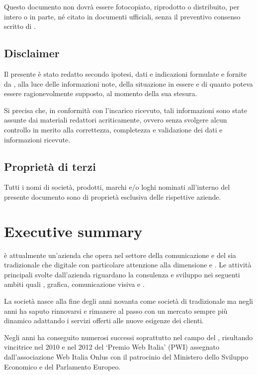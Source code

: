 Questo documento non dovrà essere fotocopiato, riprodotto o distribuito, per intero o in parte, né citato in documenti ufficiali, senza il preventivo consenso scritto di \customer.

\section{Disclaimer}
Il presente  è stato redatto secondo ipotesi, dati e indicazioni formulate e fornite da \customer, alla luce delle informazioni note, della situazione in essere e di quanto poteva essere ragionevolmente supposto, al momento della sua stesura.

Si precisa che, in conformità con l'incarico ricevuto, tali informazioni sono state assunte dai materiali redattori acriticamente, ovvero senza svolgere alcun controllo in merito alla correttezza, completezza e validazione dei dati e informazioni ricevute.

\section{Proprietà di terzi}
Tutti i nomi di società, prodotti, marchi e/o loghi nominati all'interno del presente documento sono di proprietà esclusiva delle rispettive aziende.

\chapter{Executive summary}\label{sec:summary}

\customer è attualmente un'azienda che opera nel settore della comunicazione e del \mktg sia tradizionale che digitale con particolare attenzione alla dimensione  e . Le attività principali svolte dall'azienda riguardano la consulenza e sviluppo nei seguenti ambiti quali , grafica, comunicazione visiva e \mktg {}.

La società nasce alla fine degli anni novanta come società di  tradizionale ma negli anni ha saputo rinnovarsi e rimanere al passo con un mercato sempre più dinamico adattando i servizi offerti alle nuove esigenze dei clienti.

Negli anni \customer ha conseguito numerosi successi soprattutto nel campo del , risultando vincitrice nel 2010 e nel 2012 del `Premio Web Italia' (PWI) assegnato dall'associazione \textsf{Web Italia Onlus} con il patrocinio del Ministero dello Sviluppo Economico e del Parlamento Europeo.

